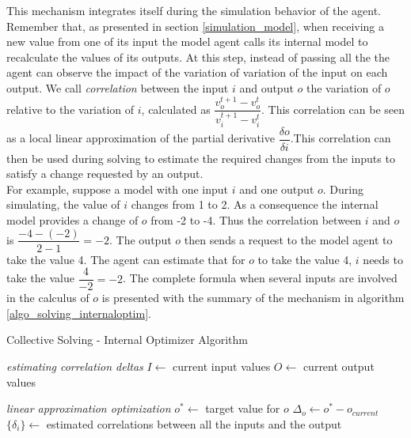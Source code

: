 This mechanism integrates itself during the simulation behavior of the agent. Remember that, as presented in section \ref{simulation_model}, when receiving a new value from one of its input the model agent calls its internal model to recalculate the values of its outputs. At this step, instead of passing all the the agent can observe the impact of the variation of variation of the input on each output. We call \emph{correlation} between the input $i$ and output $o$ the variation of $o$ relative to the variation of $i$, calculated as $\dfrac{v_o^{t+1} - v_o^t}{v_i^{t+1} - v_i^t}$. This correlation can be seen as a local linear approximation of the partial derivative $\dfrac{\delta o}{\delta i}$.This correlation can then be used during solving to estimate the required changes from the inputs to satisfy a change requested by an output.\\
For example, suppose a model with one input $i$ and one output $o$. During simulating, the value of $i$ changes from 1 to 2. As a consequence the internal model provides a change of $o$ from -2 to -4. Thus the correlation between $i$ and $o$ is $\dfrac{-4 - (-2)}{2 - 1} = -2$. The output $o$ then sends a request to the model agent to take the value 4. The agent can estimate that for $o$ to take the value 4, $i$ needs to take the value $\dfrac{4}{-2} = -2$.
The complete formula when several inputs are involved in the calculus of $o$ is presented with the summary of the mechanism in algorithm \ref{algo_solving_internaloptim}.

\begin{algorithm}
\caption{Collective Solving - Internal Optimizer Algorithm}
\label{algo_solving_internaloptim}

\emph{estimating correlation deltas}\;
$I \leftarrow$ current input values\;
$O \leftarrow$ current output values\;

\BlankLine\BlankLine
\emph{linear approximation optimization}\;
$o^* \leftarrow $ target value for $o$\;
$\Delta_o \leftarrow o^* - o_{current}$\;
$\{\delta_i\} \leftarrow $ estimated correlations between all the inputs and the output\;
\end{algorithm}


